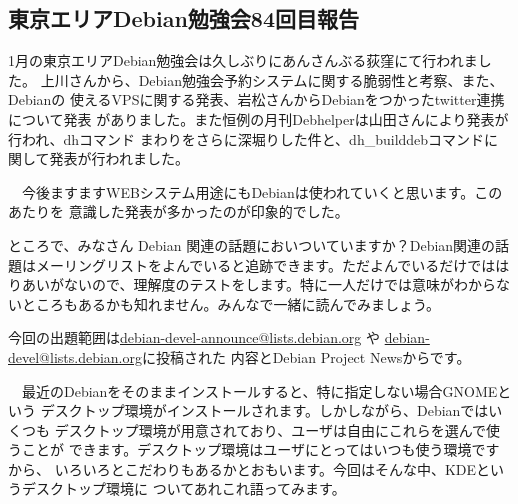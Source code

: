 \documentclass[mingoth,a4paper]{jsarticle}
\begin{document}
\subsection{東京エリアDebian勉強会84回目報告}


  1月の東京エリアDebian勉強会は久しぶりにあんさんぶる荻窪にて行われました。
上川さんから、Debian勉強会予約システムに関する脆弱性と考察、また、Debianの
使えるVPSに関する発表、岩松さんからDebianをつかったtwitter連携について発表
がありました。また恒例の月刊Debhelperは山田さんにより発表が行われ、dhコマンド
まわりをさらに深堀りした件と、dh\_builddebコマンドに関して発表が行われました。

　今後ますますWEBシステム用途にもDebianは使われていくと思います。このあたりを
意識した発表が多かったのが印象的でした。


ところで、みなさん Debian 関連の話題においついていますか？Debian関連の話
題はメーリングリストをよんでいると追跡できます。ただよんでいるだけではは
りあいがないので、理解度のテストをします。特に一人だけでは意味がわからな
いところもあるかも知れません。みんなで一緒に読んでみましょう。

今回の出題範囲は\url{debian-devel-announce@lists.debian.org} や \url{debian-devel@lists.debian.org}に投稿された
内容とDebian Project Newsからです。

\begin{multicols}{2}

\end{multicols}



　最近のDebianをそのままインストールすると、特に指定しない場合GNOMEという
デスクトップ環境がインストールされます。しかしながら、Debianではいくつも
デスクトップ環境が用意されており、ユーザは自由にこれらを選んで使うことが
できます。デスクトップ環境はユーザにとってはいつも使う環境ですから、
いろいろとこだわりもあるかとおもいます。今回はそんな中、KDEというデスクトップ環境に
ついてあれこれ語ってみます。
\end{document}
